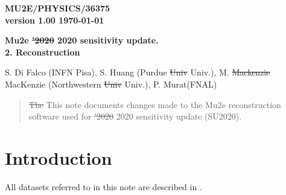 \documentclass[12pt]{article}
\newcommand {\blue}      {\color{blue}}
\newcommand {\strike}[1] {{\blue \sout{#1}}}
\begin{document}
\begin{titlepage}
  \begin{flushright}
    \bf {MU2E/PHYSICS/36375} \\
    version 1.00
    \today
 \end{flushright}

  \vspace{1cm}
  
  \begin{center}
    {\Large \bf Mu2e \strike{'2020} {\blue 2020} sensitivity update. \\
      2. Reconstruction} 
    
    \vspace{1cm}
    
    S. Di Falco (INFN Pisa), S. Huang (Purdue \strike{Univ} {\blue Univ.}),
    M. \strike{Mackenzie} {\blue MacKenzie} (Northwestern \strike{Univ} {\blue Univ.}),
    P. Murat(FNAL)
    
    \vspace{0.3cm}
    
    \vspace{0.8cm}                           
  \end{center}

  \begin{abstract}
    \strike{The} {\blue This} note documents changes made to the Mu2e reconstruction software
    used for \strike{'2020} {\blue 2020} sensitivity update (SU2020){\blue .}
  \end{abstract}

\end{titlepage}
%
%
%
{\tableofcontents}

% 


\newpage
\section { Introduction}
All datasets referred to in this note are described in \cite{MU2E_36372_SU2020_DATASETS}.










\end{document}
